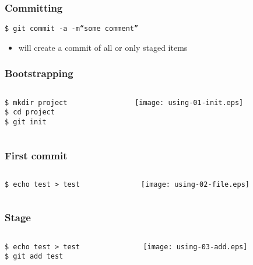 \documentclass[english]{beamer}
\newcommand{\CMD}[1]{%
\texttt{\textcolor{code-green}{#1}}%
}
\newcommand{\cmd}[1]{%
\texttt{\textcolor{code-orange}{#1}}%
}
\newcommand{\fnt}[1]{%
\texttt{\textcolor{code-gray}{#1}}%
}
\newcommand{\faint}[1]{%
\textcolor{code-gray}{#1}%
}
\begin{document}
\begin{frame}
\frametitle{Committing}

\CMD{\$ git commit \fnt{-a} -m``some comment''} \\
\begin{itemize}
        \item will create a commit of \faint{all or} only staged items
\end{itemize}
\end{frame}

\begin{frame}
\frametitle{Bootstrapping}

\begin{columns}[t]
        \begin{column}[T]{.5\textwidth}
                \cmd{\$ mkdir project} \\
                \cmd{\$ cd project} \\
                \CMD{\$ git init}
        \end{column}
        \begin{column}[T]{.5\textwidth}
                \texttt{[image: using-01-init.eps]}
        \end{column}
\end{columns}
\end{frame}

\begin{frame}
\frametitle{First commit}
\begin{columns}[t]
        \begin{column}[T]{.5\textwidth}
                \cmd{\$ echo test > test}
        \end{column}
        \begin{column}[T]{.5\textwidth}
                \texttt{[image: using-02-file.eps]}
        \end{column}
\end{columns}
\end{frame}

\begin{frame}
\frametitle{Stage}
\begin{columns}[t]
        \begin{column}[T]{.5\textwidth}
                \cmd{\$ echo test > test} \\
                \CMD{\$ git add test}
        \end{column}
        \begin{column}[T]{.5\textwidth}
                \texttt{[image: using-03-add.eps]}
        \end{column}
\end{columns}
\end{frame}
\end{document}
